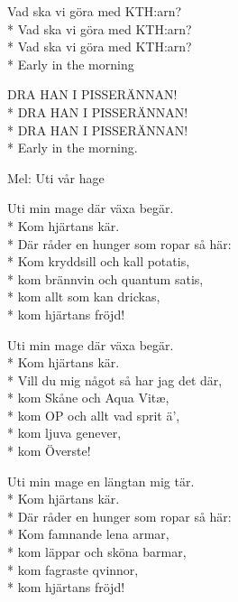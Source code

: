 \begin{SongText}
    \begin{SongVerse}
        Vad ska vi göra med KTH:arn?\\*%
        Vad ska vi göra med KTH:arn?\\*%
        Vad ska vi göra med KTH:arn?\\*%
        Early in the morning
    \end{SongVerse}
    \begin{SongVerse}
        DRA HAN I PISSERÄNNAN!\\*%
        DRA HAN I PISSERÄNNAN!\\*%
        DRA HAN I PISSERÄNNAN!\\*%
        Early in the morning.
    \end{SongVerse}
\end{SongText}
\begin{SongText}
    \begin{SongInfo}
        Mel: Uti vår hage
    \end{SongInfo}
    \begin{SongVerse}
        Uti min mage där växa begär.\\*%
        Kom hjärtans kär.\\*%
        Där råder en hunger som ropar så här:\\*%
        Kom kryddsill och kall potatis,\\*%
        kom brännvin och quantum satis,\\*%
        kom allt som kan drickas,\\*%
        kom hjärtans fröjd!
    \end{SongVerse}
    \begin{SongVerse}
        Uti min mage där växa begär.\\*%
        Kom hjärtans kär.\\*%
        Vill du mig något så har jag det där,\\*%
        kom Skåne och Aqua Vitæ,\\*%
        kom OP och allt vad sprit ä’,\\*%
        kom ljuva genever,\\*%
        kom Överste!
    \end{SongVerse}
    \begin{SongVerse}
        Uti min mage en längtan mig tär.\\*%
        Kom hjärtans kär.\\*%
        Där råder en hunger som ropar så här:\\*%
        Kom famnande lena armar,\\*%
        kom läppar och sköna barmar,\\*%
        kom fagraste qvinnor,\\*%
        kom hjärtans fröjd!
    \end{SongVerse}
\end{SongText}
